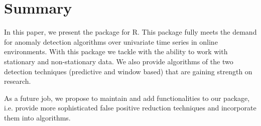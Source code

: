 \documentclass[a4paper]{article}\usepackage[]{graphicx}\usepackage[]{color}
\begin{document}
\section{Summary}\label{sec:summary}

In this paper, we present the  package for R. This package fully meets the demand for anomaly detection algorithms over univariate time series in online environments. With this package we tackle with the ability to work with stationary and non-stationary data. We also provide algorithms of the two detection techniques (predictive and window based) that are gaining strength on research.

As a future job, we propose to maintain and add functionalities to our  package, i.e. provide more sophisticated false positive reduction techniques and incorporate them into algorithms.



\end{document}
